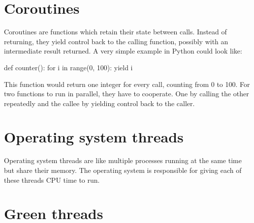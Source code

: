 \documentclass[bachelor,english]{hgbthesis}
\begin{document}
\section{Coroutines}

Coroutines are functions which retain their state between calls. Instead of returning, they yield control back to the calling function, possibly with an intermediate result returned. A very simple example in Python could look like:
\begin{GenericCode}
def counter():
    for i in range(0, 100):
	yield i
\end{GenericCode}
This function would return one integer for every call, counting from 0 to 100. For two functions to run in parallel, they have to cooperate. One by calling the other repeatedly and the callee by yielding control back to the caller.

\section{Operating system threads}

Operating system threads are like multiple processes running at the same time but share their memory. The operating system is responsible for giving each of these threads CPU time to run.

\section {Green threads}
\end{document}
